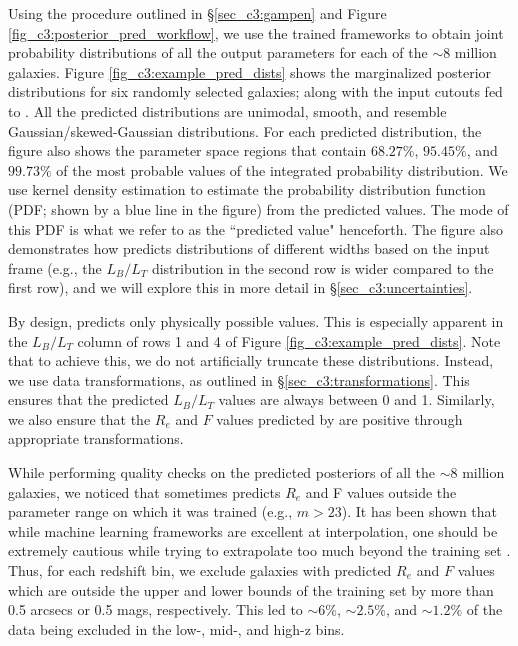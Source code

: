 Using the procedure outlined in \S \ref{sec_c3:gampen} and Figure \ref{fig_c3:posterior_pred_workflow}, we use the trained \gampen{} frameworks to obtain joint probability distributions of all the output parameters for each of the $\sim 8$ million galaxies. Figure \ref{fig_c3:example_pred_dists} shows the marginalized posterior distributions for six randomly selected galaxies; along with the input cutouts fed to \gampen{}. All the predicted distributions are unimodal, smooth, and resemble Gaussian/skewed-Gaussian distributions. For each predicted distribution, the figure also shows the parameter space regions that contain $68.27\%$, $95.45\%$, and $99.73\%$ of the most probable values of the integrated probability distribution. We use kernel density estimation to estimate the probability distribution function (PDF; shown by a blue line in the figure) from the predicted values. The mode of this PDF is what we refer to as the ``predicted value" henceforth. The figure also demonstrates how \gampen{} predicts distributions of different widths based on the input frame (e.g., the $L_B/L_T$ distribution in the second row is wider compared to the first row), and we will explore this in more detail in \S \ref{sec_c3:uncertainties}. 

By design, \gampen{} predicts only physically possible values. This is especially apparent in the $L_B/L_T$ column of rows 1 and 4 of Figure \ref{fig_c3:example_pred_dists}. Note that to achieve this, we do not artificially truncate these distributions. Instead, we use data transformations, as outlined in \S \ref{sec_c3:transformations}. This ensures that the predicted $L_B/L_T$ values are always between 0 and 1. Similarly, we also ensure  that the $R_e$ and $F$ values predicted by \gampen{} are positive through appropriate transformations. 

While performing quality checks on the predicted posteriors of all the $\sim 8$ million galaxies, we noticed that sometimes \gampen{} predicts $R_e$ and F values outside the parameter range on which it was trained (e.g., $m > 23$). It has been shown that while machine learning frameworks are excellent at interpolation, one should be extremely cautious while trying to extrapolate too much beyond the training set \citep[e.g.,][]{candela_09, recht_19, taori_20}. Thus, for each redshift bin, we exclude galaxies with predicted $R_e$ and $F$ values which are outside the upper and lower bounds of the training set by more than 0.5 arcsecs or 0.5 mags, respectively. This led to $\sim6\%$, $\sim2.5\%$, and $\sim1.2\%$ of the data being excluded in the low-, mid-, and high-z bins.

